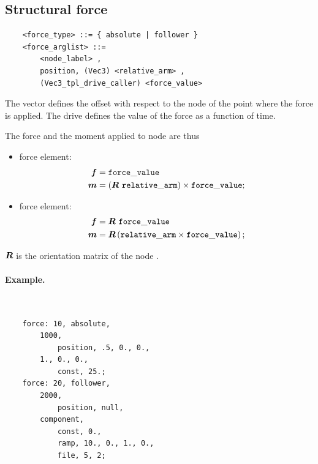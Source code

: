 \subsection{Structural force}
\label{sec:EL:FORCE:STRUCTURAL:FORCE}
\begin{verbatim}
    <force_type> ::= { absolute | follower } 
    <force_arglist> ::=
        <node_label> , 
        position, (Vec3) <relative_arm> ,
        (Vec3_tpl_drive_caller) <force_value>
\end{verbatim}
The vector  defines the offset with respect
to the node of the point where the force is applied.
The drive  defines the value of the force
as a function of time.

The force and the moment applied to node  are thus
\begin{itemize}
\item {} force element:
\begin{subequations}
\begin{align}
	\boldsymbol{f} & = \mathtt{force\_value} \\
	\boldsymbol{m} & = \left( \boldsymbol{R} \ \mathtt{relative\_arm} \right) \times \mathtt{force\_value} ;
\end{align}
\end{subequations}

\item {} force element:
\begin{subequations}
\begin{align}
	\boldsymbol{f} & = \boldsymbol{R} \ \mathtt{force\_value} \\
	\boldsymbol{m} & = \boldsymbol{R} \left( \mathtt{relative\_arm} \times \mathtt{force\_value} \right) ;
\end{align}
\end{subequations}
\end{itemize}
$\boldsymbol{R}$ is the orientation matrix of the node .

\paragraph{Example.} \
\begin{verbatim}
    force: 10, absolute,
        1000,
            position, .5, 0., 0.,
        1., 0., 0.,
            const, 25.;
    force: 20, follower,
        2000,
            position, null,
        component,
            const, 0.,
            ramp, 10., 0., 1., 0.,
            file, 5, 2;
\end{verbatim}

